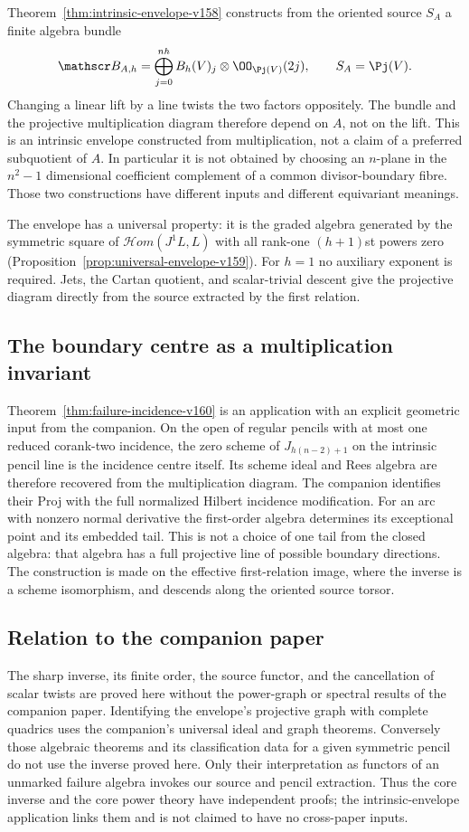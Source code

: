 Theorem~\ref{thm:intrinsic-envelope-v158} constructs from the oriented
source $S_A$ a finite algebra bundle
\[
 \mathscr B_{A,h}=\bigoplus_{j=0}^{nh}
                    B_h(V)_j\otimes\OO_{\Pj(V)}(2j),
 \qquad S_A=\Pj(V).
\]
Changing a linear lift by a line twists the two factors oppositely.
The bundle and the projective multiplication diagram therefore depend
on $A$, not on the lift. This is an intrinsic envelope constructed
from multiplication, not a claim of a preferred subquotient of $A$.
In particular it is not obtained by choosing an $n$-plane in the
$n^2-1$ dimensional coefficient complement of a common divisor-boundary
fibre. Those two constructions have different inputs and different
equivariant meanings.

The envelope has a universal property: it is the graded algebra generated
by the symmetric square of $\mathcal Hom(J^1L,L)$ with all rank-one
$(h+1)$st powers zero (Proposition~\ref{prop:universal-envelope-v159}).
For $h=1$ no auxiliary exponent is required. Jets, the Cartan quotient,
and scalar-trivial descent give the projective diagram directly from
the source extracted by the first relation.

\subsection{The boundary centre as a multiplication invariant}
Theorem~\ref{thm:failure-incidence-v160} is an application with an
explicit geometric input from the companion. On the open of regular
pencils with at most one reduced corank-two incidence, the zero scheme
of $J_{h(n-2)+1}$ on the intrinsic pencil line is the incidence centre
itself. Its scheme ideal and Rees algebra are therefore recovered
from the multiplication diagram. The companion identifies their
Proj with the full normalized Hilbert incidence modification. For an
arc with nonzero normal derivative the first-order algebra determines
its exceptional point and its embedded tail. This is not a choice of
one tail from the closed algebra: that algebra has a full projective
line of possible boundary directions. The construction is made on
the effective first-relation image, where the inverse is a scheme
isomorphism, and descends along the oriented source torsor.

\subsection{Relation to the companion paper}
The sharp inverse, its finite order, the source functor, and the
cancellation of scalar twists are proved here without the power-graph
or spectral results of the companion paper. Identifying the envelope's
projective graph with complete quadrics uses the companion's universal
ideal and graph theorems. Conversely those algebraic theorems and its
classification data for a given symmetric pencil do not use the inverse
proved here. Only their interpretation as functors of an unmarked
failure algebra invokes our source and pencil extraction. Thus the
core inverse and the core power theory have independent proofs; the
intrinsic-envelope application links them and is not claimed to have
no cross-paper inputs.


